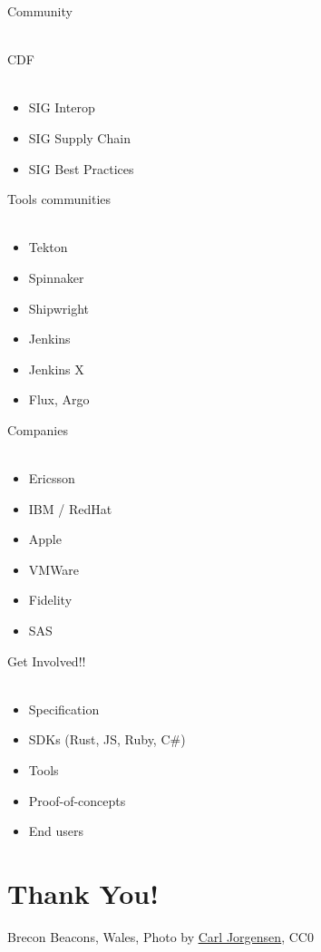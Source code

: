 \documentclass[aspectratio=169,11pt,hyperref={colorlinks=true}]{beamer}
\begin{document}
\begin{stripedframe}%
  {%
  Community
  ~ \\
  ~ \\
  }%
  {%
  CDF \\
  ~
  \begin{itemize}
    \item SIG Interop
    \item SIG Supply Chain
    \item SIG Best Practices
  \end{itemize}
  }%
  {%
  Tools communities \\
  ~
  \begin{itemize}
    \item Tekton
    \item Spinnaker
    \item Shipwright
    \item Jenkins
    \item Jenkins X
    \item Flux, Argo
  \end{itemize}
  }%
  {%
  Companies \\
  ~
  \begin{itemize}
    \item Ericsson
    \item IBM / RedHat
    \item Apple
    \item VMWare
    \item Fidelity
    \item SAS
  \end{itemize}
  }%
  {%
  Get Involved!! \\
  ~
  \begin{itemize}
    \item Specification
    \item SDKs (Rust, JS, Ruby, C\#)
    \item Tools
    \item Proof-of-concepts
    \item End users
  \end{itemize}
  }%
\end{stripedframe}

\section[Thank You]{Thank You!}

\begin{sectionwithpiclargecentral}{Brecon Beacons, Wales, Photo by \href{https://unsplash.com/@scamartist}{\underline{Carl Jorgensen}}, CC0}
\end{sectionwithpiclargecentral}
\end{document}
